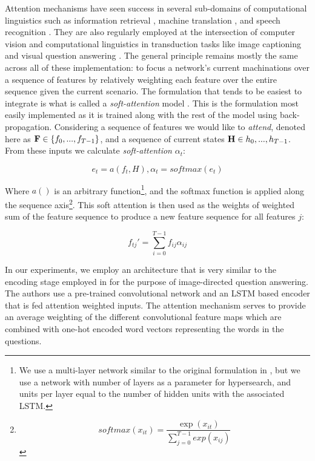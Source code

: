\documentclass[utf8]{frontiersSCNS} %
\begin{document}
Attention mechanisms have seen success in several sub-domains of computational linguistics such as information retrieval \cite{Moritz}, machine translation \cite{machine translation}, and speech recognition \cite{Bahdanau}. They are also regularly employed at the intersection of computer vision and computational linguistics in transduction tasks like image captioning \cite{XuKELVINXU, etc.} and visual question answering \cite{}. The general principle remains mostly the same across all of these implementation: to focus a network's current machinations over a sequence of features by relatively weighting each feature over the entire sequence given the current scenario. The formulation that tends to be easiest to integrate is what is called a \emph{soft-attention} model \cite{XuKELVINXU}. This is the formulation most easily implemented as it is trained along with the rest of the model using back-propagation. Considering a sequence of features we would like to \emph{attend}, denoted here as $\bold{F} \in \{f_0, ..., f_{T-1}\}$, and a sequence of current states $\bold{H} \in {h_0,...,h_{T-1}}$. From these inputs we calculate \emph{soft-attention} $\alpha_t$: 

\begin{equation} \label{eq:attn_nrg}
  e_{t} = a(f_{t}, H) , \alpha_t = softmax(e_t)
\end{equation}

Where $a()$ is an arbitrary function\footnote{We use a multi-layer network similar to the original formulation in , but we use a network with number of layers as a parameter for hypersearch, and units per layer equal to the number of hidden units with the associated LSTM.}, and the softmax function is applied along the sequence axis\footnote{\begin{equation} softmax(x_{it}) = \frac{\exp(x_{it})}{\sum_{j=0}^{T-1}exp(x_{ij})} \end{equation}}. This soft attention is then used as the weights of weighted sum of the feature sequence to produce a new feature sequence for all features $j$: 

\begin{equation} \label{eq:attn}
    f_{tj}' = \sum_{i=0}^{T-1} f_{ij} \alpha_{ij}
  \end{equation}

In our experiments, we employ an architecture that is very similar to the encoding stage employed in \cite{Zhu} for the purpose of image-directed question answering. The authors use a pre-trained convolutional network and an LSTM based encoder that is fed attention weighted inputs. The attention mechanism serves to provide an average weighting of the different convolutional feature maps which are combined with one-hot encoded word vectors representing the words in the questions.
\end{document}
